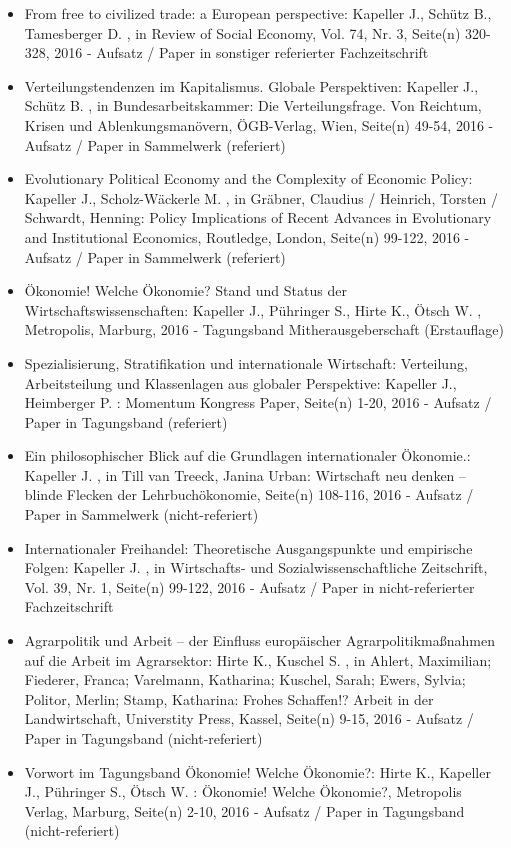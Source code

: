 \begin{itemize}
	 \item From free to civilized trade: a European perspective: Kapeller J., Schütz B., Tamesberger D. , in Review of Social Economy, Vol. 74, Nr. 3, Seite(n) 320-328, 2016 - Aufsatz / Paper in sonstiger referierter Fachzeitschrift
	 \item Verteilungstendenzen im Kapitalismus. Globale Perspektiven: Kapeller J., Schütz B. , in Bundesarbeitskammer: Die Verteilungsfrage. Von Reichtum, Krisen und Ablenkungsmanövern, ÖGB-Verlag, Wien, Seite(n) 49-54, 2016 - Aufsatz / Paper in Sammelwerk (referiert)
	 \item Evolutionary Political Economy and the Complexity of Economic Policy: Kapeller J., Scholz-Wäckerle M. , in Gräbner,  Claudius / Heinrich, Torsten / Schwardt, Henning: Policy  Implications of Recent Advances in Evolutionary and Institutional  Economics, Routledge, London, Seite(n) 99-122, 2016 - Aufsatz / Paper in Sammelwerk (referiert)
	 \item Ökonomie! Welche Ökonomie? Stand und Status der Wirtschaftswissenschaften: Kapeller J., Pühringer S., Hirte K., Ötsch W. , Metropolis, Marburg, 2016 - Tagungsband Mitherausgeberschaft (Erstauflage)
	 \item Spezialisierung, Stratifikation und internationale Wirtschaft: Verteilung, Arbeitsteilung und Klassenlagen aus globaler Perspektive: Kapeller J., Heimberger P. : Momentum Kongress Paper, Seite(n) 1-20, 2016 - Aufsatz / Paper in Tagungsband (referiert)
	 \item Ein philosophischer Blick auf die Grundlagen internationaler Ökonomie.: Kapeller J. , in Till van Treeck, Janina Urban: Wirtschaft neu denken – blinde Flecken der Lehrbuchökonomie, Seite(n) 108-116, 2016 - Aufsatz / Paper in Sammelwerk (nicht-referiert)
	 \item Internationaler Freihandel: Theoretische Ausgangspunkte und empirische Folgen: Kapeller J. , in Wirtschafts- und Sozialwissenschaftliche Zeitschrift, Vol. 39, Nr. 1, Seite(n) 99-122, 2016 - Aufsatz / Paper in nicht-referierter Fachzeitschrift
	 \item Agrarpolitik und Arbeit – der Einfluss europäischer Agrarpolitikmaßnahmen auf die Arbeit im Agrarsektor: Hirte K., Kuschel S. , in Ahlert, Maximilian; Fiederer, Franca; Varelmann, Katharina; Kuschel, Sarah; Ewers, Sylvia; Politor, Merlin; Stamp, Katharina: Frohes Schaffen!? Arbeit in der Landwirtschaft, Universtity Press, Kassel, Seite(n) 9-15, 2016 - Aufsatz / Paper in Tagungsband (nicht-referiert)
	 \item Vorwort im Tagungsband Ökonomie! Welche Ökonomie?: Hirte K., Kapeller J., Pühringer S., Ötsch W. : Ökonomie! Welche Ökonomie?, Metropolis Verlag, Marburg, Seite(n) 2-10, 2016 - Aufsatz / Paper in Tagungsband (nicht-referiert)

\end{itemize}
